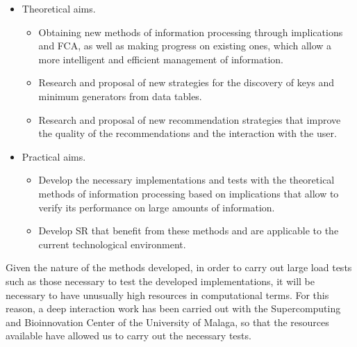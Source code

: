 \begin{itemize}
	\item Theoretical aims. 
	\begin{itemize}
		\item Obtaining new methods of information processing through implications and FCA, as well as making progress on existing ones, which allow a more intelligent and efficient management of information.
		\item Research and proposal of new strategies for the discovery of keys and minimum generators from data tables.
		\item Research and proposal of new recommendation strategies that improve the quality of the recommendations and the interaction with the user.
	\end{itemize}
	\item Practical aims.
	\begin{itemize}
		\item Develop the necessary implementations and tests with the theoretical methods of information processing based on implications that allow to verify its performance on large amounts of information.
		\item Develop SR that benefit from these methods and are applicable to the current technological environment.
	\end{itemize}
\end{itemize}

Given the nature of the methods developed, in order to carry out large load tests such as those necessary to test the developed implementations, it will be necessary to have unusually high resources in computational terms. For this reason, a deep interaction work has been carried out with the Supercomputing and Bioinnovation Center of the University of Malaga, so that the resources available have allowed us to carry out the necessary tests.

